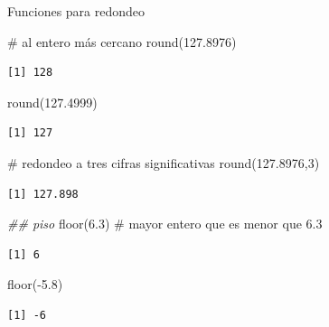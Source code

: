 \documentclass[
  ignorenonframetext,
  aspectratio=169,
  spanish,
]{beamer}
\newenvironment{Shaded}{\begin{snugshade}}{\end{snugshade}}
\newcommand{\CommentTok}[1]{\textcolor[rgb]{0.37,0.37,0.37}{#1}}
\newcommand{\DecValTok}[1]{\textcolor[rgb]{0.68,0.00,0.00}{#1}}
\newcommand{\DocumentationTok}[1]{\textcolor[rgb]{0.37,0.37,0.37}{\textit{#1}}}
\newcommand{\FloatTok}[1]{\textcolor[rgb]{0.68,0.00,0.00}{#1}}
\newcommand{\FunctionTok}[1]{\textcolor[rgb]{0.28,0.35,0.67}{#1}}
\newcommand{\NormalTok}[1]{\textcolor[rgb]{0.00,0.23,0.31}{#1}}
\newcommand{\SpecialCharTok}[1]{\textcolor[rgb]{0.37,0.37,0.37}{#1}}
\begin{document}
\begin{frame}[fragile]{Funciones para redondeo}
\label{funciones-para-redondeo}
\begin{Shaded}
\begin{Highlighting}[]
\CommentTok{\# al entero más cercano }
\FunctionTok{round}\NormalTok{(}\FloatTok{127.8976}\NormalTok{)}
\end{Highlighting}
\end{Shaded}

\begin{verbatim}
[1] 128
\end{verbatim}

\begin{Shaded}
\begin{Highlighting}[]
\FunctionTok{round}\NormalTok{(}\FloatTok{127.4999}\NormalTok{)}
\end{Highlighting}
\end{Shaded}

\begin{verbatim}
[1] 127
\end{verbatim}

\begin{Shaded}
\begin{Highlighting}[]
\CommentTok{\# redondeo a tres cifras significativas }
\FunctionTok{round}\NormalTok{(}\FloatTok{127.8976}\NormalTok{,}\DecValTok{3}\NormalTok{)}
\end{Highlighting}
\end{Shaded}

\begin{verbatim}
[1] 127.898
\end{verbatim}

\begin{Shaded}
\begin{Highlighting}[]
\DocumentationTok{\#\# piso }
\FunctionTok{floor}\NormalTok{(}\FloatTok{6.3}\NormalTok{) }\CommentTok{\# mayor entero que es menor que 6.3}
\end{Highlighting}
\end{Shaded}

\begin{verbatim}
[1] 6
\end{verbatim}

\begin{Shaded}
\begin{Highlighting}[]
\FunctionTok{floor}\NormalTok{(}\SpecialCharTok{{-}}\FloatTok{5.8}\NormalTok{)}
\end{Highlighting}
\end{Shaded}

\begin{verbatim}
[1] -6
\end{verbatim}
\end{frame}
\end{document}
